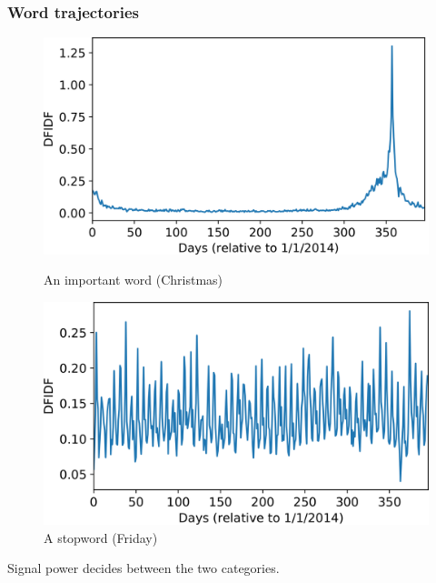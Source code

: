 \documentclass{beamer}
\begin{document}
\begin{frame}
\frametitle{Word trajectories}

\begin{figure}
        \centering
        \begin{minipage}{.5\textwidth}
            \centering
            \includegraphics[width=\linewidth]{christmas}
            \caption{An important word (Christmas)}
        \end{minipage}%
        \begin{minipage}{.5\textwidth}
            \centering
            \includegraphics[width=\linewidth]{friday}
            \caption{A stopword (Friday)}
        \end{minipage}
    \end{figure}

Signal power decides between the two categories.
\end{frame}
\end{document}
